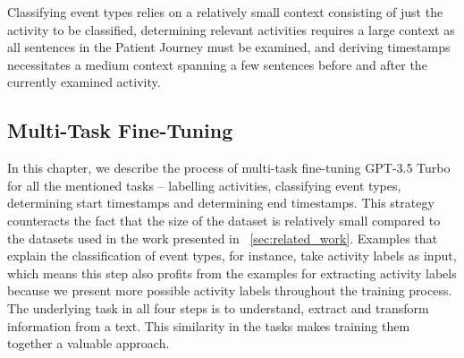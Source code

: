 Classifying event types relies on a relatively small context consisting of just the activity to be classified, determining relevant activities requires a large context as all sentences in the Patient Journey must be examined, and deriving timestamps necessitates a medium context spanning a few sentences before and after the currently examined activity.


\subsection{Multi-Task Fine-Tuning}\label{sec:multi-task-ft}
In this chapter, we describe the process of multi-task fine-tuning GPT-3.5 Turbo for all the mentioned tasks – labelling activities, classifying event types,  determining start timestamps and determining end timestamps. This strategy counteracts the fact that the size of the dataset is relatively small compared to the datasets used in the work presented in ~\autoref{sec:related_work}. Examples that explain the classification of event types, for instance, take activity labels as input, which means this step also profits from the examples for extracting activity labels because we present more possible activity labels throughout the training process. The underlying task in all four steps is to understand, extract and transform information from a text. This similarity in the tasks makes training them together a valuable approach.

